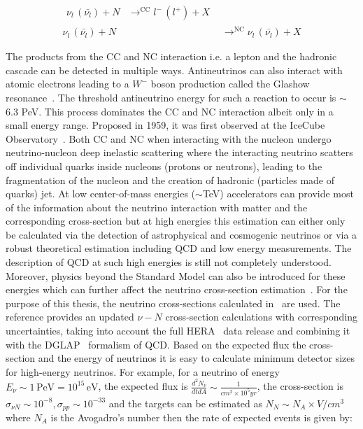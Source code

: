 \begin{subequations}\label{eq:NuCC_NC}
  \begin{align}
    \begin{split}
      \nu_l \, (\bar{\nu_l}) + N &\mathop{\longrightarrow}^{\mathrm{CC}} l^- \, (l^+) + X 
    \end{split} \\
    \nu_l \, (\bar{\nu_l}) + N &\mathop{\longrightarrow}^{\mathrm{NC}} \nu_l \, (\bar{\nu_l}) + X
  \end{align}
\end{subequations}

The products from the CC and NC interaction i.e. a lepton and the hadronic cascade can be detected in multiple ways. 
Antineutrinos can also interact with atomic electrons leading to a $W^-$ boson production called the Glashow resonance~\cite{PhysRev.118.316}. The threshold antineutrino energy for such a reaction to occur is $\sim$6.3 PeV. This process dominates the CC and NC interaction albeit only in a small energy range. Proposed in 1959, it was first observed at the IceCube Observatory~\cite{IceCube:2021rpz}. Both CC and NC when interacting with the nucleon undergo neutrino-nucleon deep inelastic scattering where the interacting neutrino scatters off individual quarks inside nucleons (protons or neutrons), leading to the fragmentation of the nucleon and the creation of hadronic (particles made of quarks) jet. At low center-of-mass energies ($\sim$TeV) accelerators can provide most of the information about the neutrino interaction with matter and the corresponding cross-section but at high energies this estimation can either only be calculated via the detection of astrophysical and cosmogenic neutrinos or via a robust theoretical estimation including \gls{QCD} and low energy measurements. The description of \gls*{QCD} at such high energies is still not completely understood. Moreover, physics beyond the Standard Model can also be introduced for these energies which can further affect the neutrino cross-section estimation~\cite{PhysRevD.107.033009}. For the purpose of this thesis, the neutrino cross-sections calculated in~\cite{Cooper_Sarkar_2011} are used. The reference provides an updated $\nu -N$ cross-section calculations with corresponding uncertainties, taking into account the full HERA~\cite{aaron2010combined} data release and combining it with the DGLAP~\cite{ALTARELLI1977298,Dokshitzer:1977sg,Gribov:427157} formalism of QCD. Based on the expected flux the cross-section and the energy of neutrinos it is easy to calculate minimum detector sizes for high-energy neutrinos. For example, for a neutrino of energy $E_{\nu} \sim 1\,\text{PeV} = 10^{15}\,\text{eV}$, the expected flux is $\frac{d^2N_{\nu}}{dt dA} \sim \frac{1}{cm^2 \times 10^5 yr}$, the cross-section is $\sigma_{\nu N} \sim 10^{-8} , \sigma_{pp} \sim 10^{-33}$ and the targets can be estimated as $ N_N \sim N_A \times V/cm^3$ where $N_A$ is the Avogadro's number then the rate of expected events is given by:

